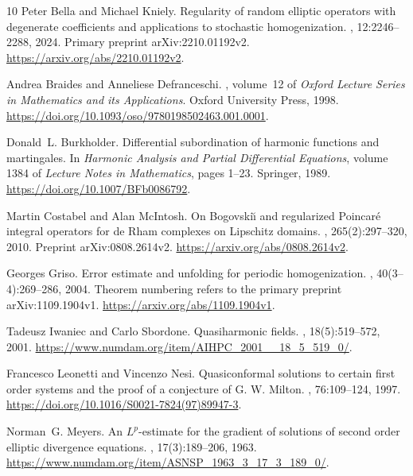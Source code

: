 \documentclass[11pt,a4paper]{article}
\numberwithin{equation}{section}
\theoremstyle{definition}
\theoremstyle{remark}\newtheorem{remark}[theorem]{Remark}
\begin{document}
\begin{thebibliography}{10}
Peter Bella and Michael Kniely.
\newblock Regularity of random elliptic operators with degenerate coefficients
  and applications to stochastic homogenization.
, 12:2246--2288, 2024.
\newblock Primary preprint arXiv:2210.01192v2.
  \url{https://arxiv.org/abs/2210.01192v2}.

Andrea Braides and Anneliese Defranceschi.
, volume~12 of {\em Oxford
  Lecture Series in Mathematics and its Applications}.
\newblock Oxford University Press, 1998.
\newblock \url{https://doi.org/10.1093/oso/9780198502463.001.0001}.

Donald~L. Burkholder.
\newblock Differential subordination of harmonic functions and martingales.
\newblock In {\em Harmonic Analysis and Partial Differential Equations}, volume
  1384 of {\em Lecture Notes in Mathematics}, pages 1--23. Springer, 1989.
\newblock \url{https://doi.org/10.1007/BFb0086792}.

Martin Costabel and Alan McIntosh.
\newblock On {Bogovski\u{\i}} and regularized {Poincar{\'e}} integral operators
  for {de Rham} complexes on {Lipschitz} domains.
, 265(2):297--320, 2010.
\newblock Preprint arXiv:0808.2614v2. \url{https://arxiv.org/abs/0808.2614v2}.

Georges Griso.
\newblock Error estimate and unfolding for periodic homogenization.
, 40(3--4):269--286, 2004.
\newblock Theorem numbering refers to the primary preprint arXiv:1109.1904v1.
  \url{https://arxiv.org/abs/1109.1904v1}.

Tadeusz Iwaniec and Carlo Sbordone.
\newblock Quasiharmonic fields.
, 18(5):519--572, 2001.
\newblock \url{https://www.numdam.org/item/AIHPC_2001__18_5_519_0/}.

Francesco Leonetti and Vincenzo Nesi.
\newblock Quasiconformal solutions to certain first order systems and the proof
  of a conjecture of {G. W. Milton}.
,
  76:109--124, 1997.
\newblock \url{https://doi.org/10.1016/S0021-7824(97)89947-3}.

Norman~G. Meyers.
\newblock An {$L^p$}-estimate for the gradient of solutions of second order
  elliptic divergence equations.
, 17(3):189--206, 1963.
\newblock \url{https://www.numdam.org/item/ASNSP_1963_3_17_3_189_0/}.


\end{thebibliography}
\end{document}
